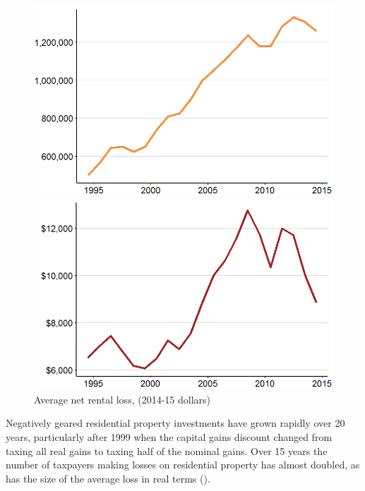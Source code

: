 \documentclass{grattan}\usepackage[]{graphicx}\usepackage[]{color}
\begin{document}
\begin{figure}
\includegraphics[width=\columnwidth]{CGT-NG-atlas//number-NG-time-series-1}
\vspace*{4pt}
\caption*{Average net rental loss, (2014-15 dollars)}\label{fig:number-NG-and-net-losses-time-series}
\includegraphics[width=\columnwidth]{CGT-NG-atlas//avg-net-losses-time-series-1}
\end{figure}

Negatively geared residential property investments have grown rapidly over 20 years, particularly after 1999 when the capital gains discount changed from taxing all real gains to taxing half of the nominal gains. Over 15 years the number of taxpayers making losses on residential property has almost doubled, as has the size of the average loss in real terms ().
\end{document}
